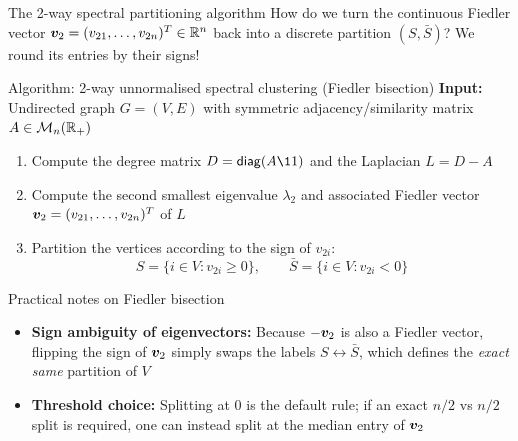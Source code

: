 \documentclass[aspectratio=169]{beamer}\usepackage[]{graphicx}\usepackage[]{xcolor}
\begin{document}
\begin{frame}{The 2-way spectral partitioning algorithm}
How do we turn the continuous Fiedler vector $\bm{v}_2 = (v_{21}, \ldots, v_{2n})^T \in \mathbb{R}^n$ back into a discrete partition $(S, \bar{S})$?
We round its entries by their signs!
\vfill
\setImportantBlockColors
\begin{block}{Algorithm: 2-way unnormalised spectral clustering (Fiedler bisection)}
\textbf{Input:} Undirected graph $G = (V, E)$ with symmetric adjacency/similarity matrix $A \in \mathcal{M}_n(\mathbb{R}_+)$
\begin{enumerate}
\item Compute the degree matrix $D = \diag(A\11)$ and the Laplacian $L = D - A$
\item Compute the second smallest eigenvalue $\lambda_2$ and associated Fiedler vector $\bm{v}_2 = (v_{21}, \ldots, v_{2n})^T$ of $L$
\item Partition the vertices according to the sign of $v_{2i}$:
\[
S = \{i \in V : v_{2i} \ge 0\}, \qquad \bar{S} = \{i \in V : v_{2i} < 0\}
\]
\end{enumerate}
\end{block}
\resetBlockColors
\end{frame}


\begin{frame}{Practical notes on Fiedler bisection}
\begin{itemize}
\item \textbf{Sign ambiguity of eigenvectors:} Because $-\bm{v}_2$ is also a Fiedler vector, flipping the sign of $\bm{v}_2$ simply swaps the labels $S \leftrightarrow \bar{S}$, which defines the \emph{exact same} partition of $V$
\vfill
\item \textbf{Threshold choice:} Splitting at $0$ is the default rule; if an exact $n/2$ vs $n/2$ split is required, one can instead split at the median entry of $\bm{v}_2$
\end{itemize}
\end{frame}
\end{document}
